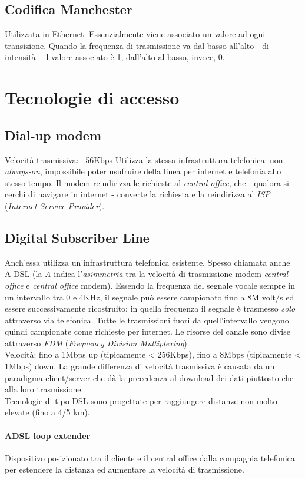 \subsection{Codifica Manchester}
Utilizzata in Ethernet. Essenzialmente viene associato un valore ad ogni transizione. Quando la frequenza di trasmissione va dal basso all'alto - di intensità - il valore associato è 1, dall'alto al basso, invece, 0.

\section{Tecnologie di accesso}
\subsection{Dial-up modem}
Velocità trasmissiva: ~56Kbps
Utilizza la stessa infrastruttura telefonica: non \textit{always-on}, impossibile poter usufruire della linea per internet e telefonia allo stesso tempo.
Il modem reindirizza le richieste al \textit{central office}, che - qualora si cerchi di navigare in internet - converte la richiesta e la reindirizza al \textit{ISP} (\textit{Internet Service Provider}).

\subsection{Digital Subscriber Line}
Anch'essa utilizza un'infrastruttura telefonica esistente. Spesso chiamata anche A-DSL (la \textit{A} indica l'\textit{asimmetria} tra la velocità di trasmissione modem \to \textit{central office} e \textit{central office} \to modem).
Essendo la frequenza del segnale vocale sempre in un intervallo tra 0 e 4KHz, il segnale può essere campionato fino a 8M volt/s ed essere successivamente ricostruito; in quella frequenza il segnale è trasmesso \textit{solo} attraverso via telefonica. Tutte le trasmissioni fuori da quell'intervallo vengono quindi campionate come richieste per internet.
Le risorse del canale sono divise attraverso \textit{FDM} (\textit{Frequency Division Multiplexing}).\\
Velocità: fino a 1Mbps up (tipicamente < 256Kbps), fino a 8Mbps (tipicamente < 1Mbps) down. La grande differenza di velocità trasmissiva è causata da un paradigma client/server che dà la precedenza al download dei dati piuttosto che alla loro trasmissione.
\\
Tecnologie di tipo DSL sono progettate per raggiungere distanze non molto elevate (fino a 4/5 km).
\paragraph{ADSL loop extender} 
Dispositivo posizionato tra il cliente e il central office dalla compagnia telefonica per estendere la distanza ed aumentare la velocità di trasmissione.


